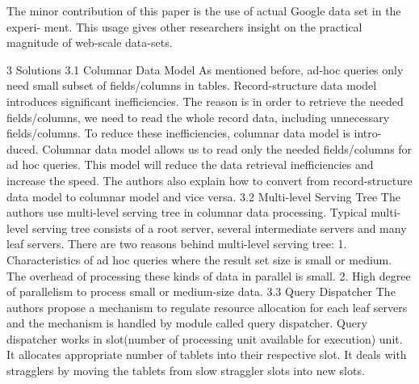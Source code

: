\documentclass[twocolumn]{article}
\begin{document}
The minor contribution of this paper is the use of actual Google data set in the experi- ment. This usage gives other researchers insight on the practical magnitude of web-scale data-sets.


3 Solutions
3.1 Columnar Data Model
As mentioned before, ad-hoc queries only need small subset of fields/columns in tables. Record-structure data model introduces significant inefficiencies. The reason is in order to retrieve the needed fields/columns, we need to read the whole record data, including unnecessary fields/columns. To reduce these inefficiencies, columnar data model is intro- duced. Columnar data model allows us to read only the needed fields/columns for ad hoc queries. This model will reduce the data retrieval inefficiencies and increase the speed. The authors also explain how to convert from record-structure data model to columnar model and vice versa.
3.2 Multi-level Serving Tree
The authors use multi-level serving tree in columnar data processing. Typical multi-level serving tree consists of a root server, several intermediate servers and many leaf servers. There are two reasons behind multi-level serving tree:
1. Characteristics of ad hoc queries where the result set size is small or medium. The overhead of processing these kinds of data in parallel is small.
2. High degree of parallelism to process small or medium-size data.
3.3 Query Dispatcher
The authors propose a mechanism to regulate resource allocation for each leaf servers and the mechanism is handled by module called query dispatcher. Query dispatcher works in slot(number of processing unit available for execution) unit. It allocates appropriate number of tablets into their respective slot. It deals with stragglers by moving the tablets from slow straggler slots into new slots.
\end{document}
